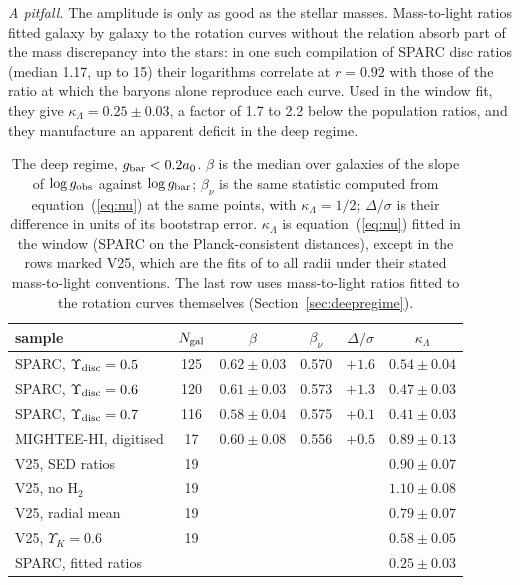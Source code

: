 \documentclass[fleqn,usenatbib]{mnras}
\begin{document}
\emph{A pitfall.} The amplitude is only as good as the stellar masses. Mass-to-light ratios fitted galaxy by galaxy to the rotation curves without the relation absorb part of the mass discrepancy into the stars: in one such compilation of SPARC disc ratios (median 1.17, up to 15) their logarithms correlate at $r=0.92$ with those of the ratio at which the baryons alone reproduce each curve. Used in the window fit, they give $\kappa_\Lambda=0.25\pm0.03$, a factor of 1.7 to 2.2 below the population ratios, and they manufacture an apparent deficit in the deep regime.

\begin{table}
\caption{The deep regime, $g_{\rm bar}<0.2a_0$. $\beta$ is the median over galaxies of the slope of $\log g_{\rm obs}$ against $\log g_{\rm bar}$; $\beta_\nu$ is the same statistic computed from equation~(\ref{eq:nu}) at the same points, with $\kappa_\Lambda=1/2$; $\Delta/\sigma$ is their difference in units of its bootstrap error. $\kappa_\Lambda$ is equation~(\ref{eq:nu}) fitted in the window (SPARC on the Planck-consistent distances), except in the rows marked V25, which are the fits of \citet{Varasteanu2025} to all radii under their stated mass-to-light conventions. The last row uses mass-to-light ratios fitted to the rotation curves themselves (Section~\ref{sec:deepregime}).}
\label{tab:deep}
\setlength{\tabcolsep}{3.5pt}
\begin{tabular}{@{}lccccc@{}}
\toprule
sample & $N_{\rm gal}$ & $\beta$ & $\beta_\nu$ & $\Delta/\sigma$ & $\kappa_\Lambda$\\
\midrule
SPARC, $\Upsilon_{\rm disc}=0.5$ & 125 & $0.62\pm0.03$ & 0.570 & $+1.6$ & $0.54\pm0.04$\\
SPARC, $\Upsilon_{\rm disc}=0.6$ & 120 & $0.61\pm0.03$ & 0.573 & $+1.3$ & $0.47\pm0.03$\\
SPARC, $\Upsilon_{\rm disc}=0.7$ & 116 & $0.58\pm0.04$ & 0.575 & $+0.1$ & $0.41\pm0.03$\\
MIGHTEE-HI, digitised & 17 & $0.60\pm0.08$ & 0.556 & $+0.5$ & $0.89\pm0.13$\\
\midrule
V25, SED ratios & 19 & & & & $0.90\pm0.07$\\
V25, no H$_2$ & 19 & & & & $1.10\pm0.08$\\
V25, radial mean & 19 & & & & $0.79\pm0.07$\\
V25, $\Upsilon_K=0.6$ & 19 & & & & $0.58\pm0.05$\\
\midrule
SPARC, fitted ratios & & & & & $0.25\pm0.03$\\
\bottomrule
\end{tabular}
\end{table}
\end{document}
